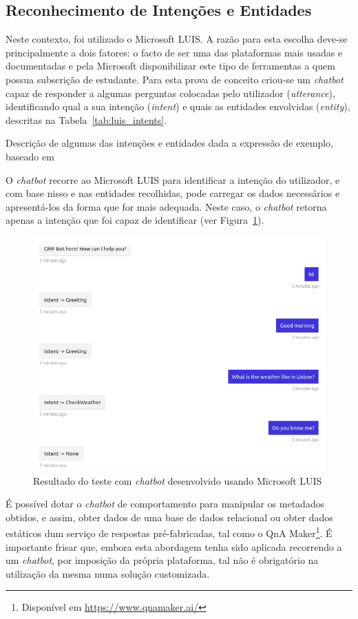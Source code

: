 \subsection{Reconhecimento de Intenções e Entidades}
Neste contexto, foi utilizado o Microsoft LUIS. A razão para esta escolha deve-se principalmente a dois fatores: o facto de ser uma das plataformas mais usadas e documentadas e pela Microsoft disponibilizar este tipo de ferramentas a quem possua subscrição de estudante. Para esta prova de conceito criou-se um \textit{chatbot} capaz de responder a algumas perguntas colocadas pelo utilizador (\textit{utterance}), identificando qual a sua intenção (\textit{intent}) e quais as entidades envolvidas (\textit{entity}), descritas na Tabela~\ref{tab:luis_intents}.
%
\begin{table}
\caption{Descrição de algumas das intenções e entidades dada a expressão de exemplo, baseado em~\textcite[Concepts]{microsoft_luis_official}}
\label{tab:luis_intents}
\centering
\resizebox{\textwidth}{!}{
\renewcommand{\arraystretch}{1.3}
\footnotesize

}
\end{table}

O \textit{chatbot} recorre ao Microsoft LUIS para identificar a intenção do utilizador, e com base nisso e nas entidades recolhidas, pode carregar os dados necessários e apresentá-los da forma que for mais adequada. Neste caso, o \textit{chatbot} retorna apenas a intenção que foi capaz de identificar (ver Figura~\ref{fig:chatbotexample}).
%
\begin{figure}
\centering
\includegraphics[width=.8\textwidth]{ch03/assets/chatbot.png}
\caption{Resultado do teste com \textit{chatbot} desenvolvido usando Microsoft LUIS}
\label{fig:chatbotexample}
\end{figure}
%
É possível dotar o \textit{chatbot} de comportamento para manipular os metadados obtidos, e assim, obter dados de uma base de dados relacional ou obter dados estáticos dum serviço de respostas pré-fabricadas, tal como o QnA Maker\footnote{Disponível em \url{https://www.qnamaker.ai/}}. É importante frisar que, embora esta abordagem tenha sido aplicada recorrendo a um \textit{chatbot}, por imposição da própria plataforma, tal não é obrigatório na utilização da mesma numa solução customizada. 

